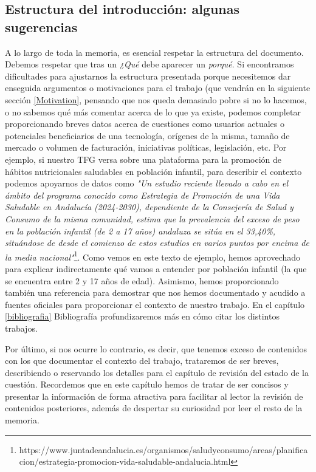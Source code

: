 \subsection{Estructura del introducción: algunas sugerencias}
A lo largo de toda la memoria, es esencial respetar la estructura del documento. Debemos respetar que tras un \textit{¿Qué} debe aparecer un \textit{porqué}.
Si encontramos dificultades para ajustarnos la estructura presentada porque necesitemos dar enseguida argumentos o motivaciones para el trabajo (que vendrán en la siguiente sección \ref{Motivation}, pensando que nos queda demasiado pobre si no lo hacemos, o no sabemos qué más comentar acerca de lo que ya existe, podemos completar proporcionando breves datos acerca de cuestiones como usuarios actuales o potenciales beneficiarios de una tecnología, orígenes de la misma, tamaño de mercado o volumen de facturación, iniciativas políticas, legislación, etc. Por ejemplo, si nuestro TFG versa sobre una plataforma para la promoción de hábitos nutricionales saludables en población infantil, para describir el contexto podemos apoyarnos de datos como \textit{"Un estudio reciente llevado a cabo en el ámbito del programa conocido como Estrategia de Promoción de una Vida Saludable en Andalucía (2024-2030), dependiente de la Consejería de Salud y Consumo de la misma comunidad, estima que la prevalencia del exceso de peso en la población infantil (de 2 a 17 años) andaluza se sitúa en el 33,40\%, situándose de desde el comienzo de estos estudios en varios puntos por encima de la media nacional"}\footnote{https://www.juntadeandalucia.es/organismos/saludyconsumo/areas/planificacion/estrategia-promocion-vida-saludable-andalucia.html}. Como vemos en este texto de ejemplo, hemos aprovechado para explicar indirectamente qué vamos a entender por población infantil (la que se encuentra entre 2 y 17 años de edad). Asimismo, hemos proporcionado también una referencia para demostrar que nos hemos documentado y acudido a fuentes oficiales para proporcionar el contexto de nuestro trabajo. En el capítulo  \ref{bibliografia} Bibliografía profundizaremos más en cómo citar los distintos trabajos.

Por último, si nos ocurre lo contrario, es decir, que tenemos exceso de contenidos con los que documentar el contexto del trabajo, trataremos de ser breves, describiendo o reservando los detalles para el capítulo de revisión del estado de la cuestión. Recordemos que en este capítulo hemos de tratar de ser concisos y presentar la información de forma atractiva para facilitar al lector la revisión de contenidos posteriores, además de despertar su curiosidad por leer el resto de la memoria.

